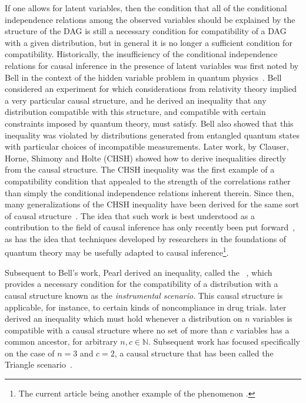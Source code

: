 If one allows for latent variables, then the condition that all of the conditional independence relations among the observed variables should be explained by the structure of the DAG is still a necessary condition for compatibility of a DAG with a given distribution, but in general it is no longer a sufficient condition for compatibility. Historically, the insufficiency of the conditional independence relations for causal inference in the presence of latent variables was first noted by Bell in the context of the hidden variable problem in quantum physics~\cite{bell1964einstein}. Bell considered an experiment for which considerations from relativity theory implied a very particular causal structure, and he derived an inequality that any distribution compatible with this structure, and compatible with certain constraints imposed by quantum theory, must satisfy.  Bell also showed that this inequality was violated by distributions generated from entangled quantum states with particular choices of incompatible measurements.
Later work, by Clauser, Horne, Shimony and Holte (CHSH) \cite{CHSHOriginal} showed how to derive inequalities directly from the causal structure. The CHSH inequality was the first example of a compatibility condition that appealed to the strength of the correlations rather than simply the conditional independence relations inherent therein.  Since then, many generalizations of the CHSH inequality have been derived for the same sort of causal structure~\cite{Brunner2013Bell}. The idea that such work is best understood as a contribution to the field of causal inference has only recently been put forward~\cite{WoodSpekkens,fritz2012bell,pusey2014gdag,BeyondBellII}, as has the idea that techniques developed by researchers in the foundations of quantum theory may be usefully adapted to causal inference\footnote{The current article being another example of the phenomenon \cite{ChavesNoSignalling,chaves2014informationinference,weilenmann2016entropic,kela2016covariance,ChavesPolynomial,TavakoliStarNetworks,RossetNetworks,TavakoliNoncyclicNetworks}.}.

Subsequent to Bell's work, Pearl derived an inequality, called the ~\cite{pearl1995instrumental}, which provides a necessary condition for the compatibility of a distribution with a causal structure 
known as the \emph{instrumental scenario}.  This causal structure is applicable, for instance, to certain kinds of noncompliance in drug trials. \citet{steudel2010ancestors} later derived an inequality which must hold whenever a distribution on $n$
variables is compatible with a causal structure where no set of more
than $c$ variables has a common ancestor, for arbitrary $n,c \in \mathbb{N}$.  Subsequent work has focused specifically on the case of $n=3$ and $c=2$, a causal structure that has been called the Triangle scenario~\cite{fritz2012bell,chaves2014novel}.

